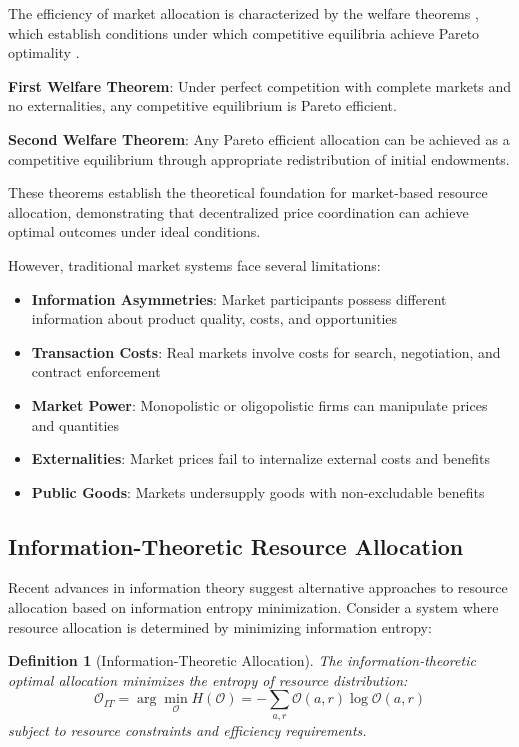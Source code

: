 \documentclass[12pt,a4paper]{article}
\newtheorem{definition}[theorem]{Definition}
\begin{document}
The efficiency of market allocation is characterized by the welfare theorems \cite{samuelson1947,debreu1959}, which establish conditions under which competitive equilibria achieve Pareto optimality \cite{pareto1906}.

\textbf{First Welfare Theorem}: Under perfect competition with complete markets and no externalities, any competitive equilibrium is Pareto efficient.

\textbf{Second Welfare Theorem}: Any Pareto efficient allocation can be achieved as a competitive equilibrium through appropriate redistribution of initial endowments.

These theorems establish the theoretical foundation for market-based resource allocation, demonstrating that decentralized price coordination can achieve optimal outcomes under ideal conditions.

However, traditional market systems face several limitations:
\begin{itemize}
\item \textbf{Information Asymmetries}: Market participants possess different information about product quality, costs, and opportunities
\item \textbf{Transaction Costs}: Real markets involve costs for search, negotiation, and contract enforcement \cite{coase1937,williamson1975}
\item \textbf{Market Power}: Monopolistic or oligopolistic firms can manipulate prices and quantities
\item \textbf{Externalities}: Market prices fail to internalize external costs and benefits
\item \textbf{Public Goods}: Markets undersupply goods with non-excludable benefits
\end{itemize}

\subsection{Information-Theoretic Resource Allocation}

Recent advances in information theory suggest alternative approaches to resource allocation based on information entropy minimization. Consider a system where resource allocation is determined by minimizing information entropy:

\begin{definition}[Information-Theoretic Allocation]
The information-theoretic optimal allocation minimizes the entropy of resource distribution:
\begin{equation}
\mathcal{O}_{IT} = \arg\min_{\mathcal{O}} H(\mathcal{O}) = -\sum_{a,r} \mathcal{O}(a,r) \log \mathcal{O}(a,r)
\end{equation}
subject to resource constraints and efficiency requirements.
\end{definition}
\end{document}
